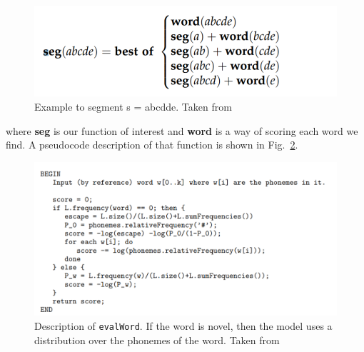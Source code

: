 \documentclass{article}
\begin{document}
\begin{figure}[h]
    \centering
    \includegraphics[scale=0.8]{figures/venkataram_seg_example.PNG}
    \caption{Example to segment s = abcdde. Taken from \citet{Venkataraman}}
    \label{fig:fig7}
\end{figure}

where \textbf{seg} is our function of interest and \textbf{word} is a way of scoring each word we find. A pseudocode description of that function is shown in Fig.~\ref{fig:fig8}.

\begin{figure}[h!]
    \centering
    \includegraphics[scale=0.8]{figures/venkataram_evalword.PNG}
    \caption{Description of \texttt{evalWord}. If the word is novel, then the model uses a distribution over the phonemes of the word. Taken from \citet{Venkataraman}}
    \label{fig:fig8}
\end{figure}
\end{document}
